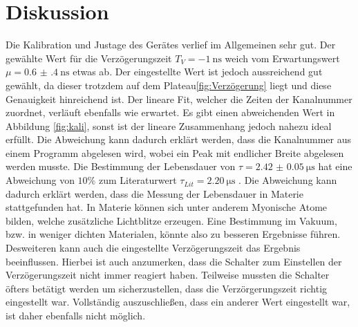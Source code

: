 \section{Diskussion}
Die Kalibration und Justage des Gerätes verlief im Allgemeinen sehr gut. 
Der gewählte Wert für die Verzögerungszeit $T_{V} = \SI{-1}{\nano\second}$ weich vom
Erwartungswert $\mu = \SI{0.6(4)}{\nano\second}$ etwas ab. Der eingestellte Wert ist jedoch aussreichend gut 
gewählt, da dieser trotzdem auf dem Plateau\ref{fig:Verzögerung} liegt und diese Genauigkeit hinreichend ist.
Der lineare Fit, welcher die Zeiten der Kanalnummer zuordnet, verläuft ebenfalls wie erwartet. Es gibt einen 
abweichenden Wert 
in Abbildung \ref{fig:kali}, sonst ist der lineare Zusammenhang jedoch nahezu ideal erfüllt. 
Die Abweichung kann dadurch erklärt werden, dass die Kanalnummer aus einem Programm abgelesen 
wird, wobei ein Peak mit endlicher Breite abgelesen werden musste. 
Die Bestimmung der Lebensdauer von $\tau = \SI{2.42(5)}{\micro\second}$ hat eine Abweichung von $10 \%$ zum 
Literaturwert $\tau_{Lit} = \SI{2.20}{\micro\second}$ \cite{PDG}. Die Abweichung kann 
dadurch erklärt werden, dass die Messung der Lebensdauer in Materie stattgefunden hat. In Materie können 
sich unter anderem Myonische Atome bilden, welche zusätzliche Lichtblitze erzeugen.
Eine Bestimmung im Vakuum, bzw. in weniger dichten Materialen, könnte also zu besseren Ergebnisse 
führen. Desweiteren kann auch die eingestellte Verzögerungszeit das Ergebnis beeinflussen. 
Hierbei ist auch anzumerken, dass die Schalter zum Einstellen der Verzögerungszeit nicht immer reagiert 
haben. Teilweise mussten die Schalter öfters betätigt werden um sicherzustellen, dass die 
Verzörgerungszeit richtig eingestellt war. Vollständig auszuschließen, dass ein anderer Wert 
eingestellt war, ist daher ebenfalls nicht möglich.